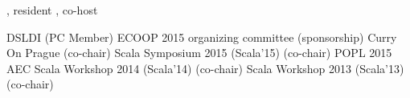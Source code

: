\documentclass[9pt]{article}
\begin{document}



\medskip
{}

, resident
\newline{}, co-host

\bigskip

\medskip
{}

\newline\noindent DSLDI (PC Member)
\newline\noindent ECOOP 2015 organizing committee (sponsorship)
\newline\noindent Curry On Prague (co-chair)
\newline\noindent Scala Symposium 2015 (Scala'15) (co-chair)
\newline\noindent POPL 2015 AEC
\newline\noindent Scala Workshop 2014 (Scala'14) (co-chair)
\newline\noindent Scala Workshop 2013 (Scala'13) (co-chair)
\end{document}
